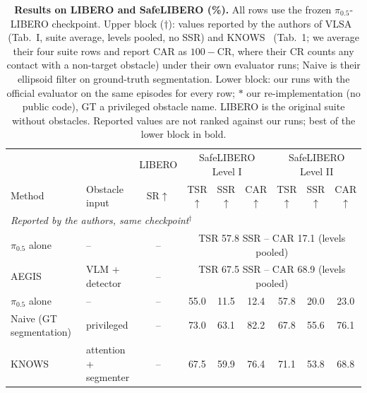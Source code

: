 \begin{table}[t]
\centering
\caption{\textbf{Results on LIBERO and SafeLIBERO (\%).} All rows use the frozen $\pi_{0.5}$-LIBERO checkpoint. Upper block ($\dagger$): values reported by the authors of VLSA~\cite{hu2026vlsa} (Tab.~I, suite average, levels pooled, no SSR) and KNOWS~\cite{park2026knows} (Tab.~1; we average their four suite rows and report CAR as $100-$CR, where their CR counts any contact with a non-target obstacle) under their own evaluator runs; Naive is their ellipsoid filter on ground-truth segmentation. Lower block: our runs with the official evaluator on the same episodes for every row; $\ast$ our re-implementation (no public code), GT a privileged obstacle name. LIBERO is the original suite without obstacles. Reported values are not ranked against our runs; best of the lower block in bold.  }
\label{tab:safelibero}
\footnotesize
\setlength{\tabcolsep}{4pt}
\begin{tabular}{llc|ccc|ccc}
\toprule
 & & LIBERO & \multicolumn{3}{c|}{SafeLIBERO Level I} & \multicolumn{3}{c}{SafeLIBERO Level II}\\
Method & Obstacle input & SR$\uparrow$ & TSR$\uparrow$ & SSR$\uparrow$ & CAR$\uparrow$ & TSR$\uparrow$ & SSR$\uparrow$ & CAR$\uparrow$\\
\midrule
\multicolumn{9}{l}{\emph{Reported by the authors, same checkpoint}$^\dagger$}\\
$\pi_{0.5}$ alone~\cite{hu2026vlsa} & -- & -- & \multicolumn{6}{c}{TSR 57.8 \quad SSR -- \quad CAR 17.1 \quad (levels pooled)}\\
AEGIS~\cite{hu2026vlsa} & VLM + detector & -- & \multicolumn{6}{c}{TSR 67.5 \quad SSR -- \quad CAR 68.9 \quad (levels pooled)}\\
$\pi_{0.5}$ alone~\cite{park2026knows} & -- & -- & 55.0 & 11.5 & 12.4 & 57.8 & 20.0 & 23.0\\
Naive (GT segmentation)~\cite{park2026knows} & privileged & -- & 73.0 & 63.1 & 82.2 & 67.8 & 55.6 & 76.1\\
KNOWS~\cite{park2026knows} & attention + segmenter & -- & 67.5 & 59.9 & 76.4 & 71.1 & 53.8 & 68.8\\

\end{tabular}
\end{table}
